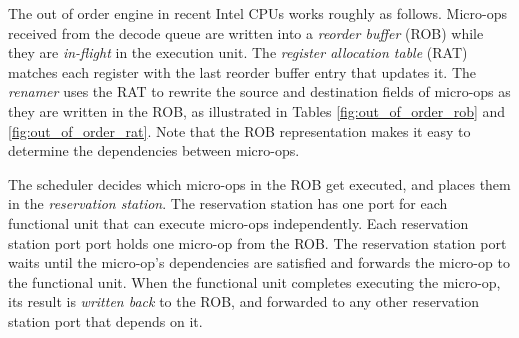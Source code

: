 
The out of order engine in recent Intel CPUs works roughly as follows.
Micro-ops received from the decode queue are written into a \textit{reorder
buffer} (ROB) while they are \textit{in-flight} in the execution unit. The
\textit{register allocation table} (RAT) matches each register with the last
reorder buffer entry that updates it. The \textit{renamer} uses the RAT to
rewrite the source and destination fields of micro-ops as they are written in
the ROB, as illustrated in Tables \ref{fig:out_of_order_rob} and
\ref{fig:out_of_order_rat}. Note that the ROB representation makes it easy to
determine the dependencies between micro-ops.

\begin{table}[hbt]
  \caption{
    Data written by the renamer into the reorder buffer (ROB), for the
    micro-ops in Table~\ref{fig:out_of_order_micro_ops}.
  }
  \label{fig:out_of_order_rob}
\end{table}

\begin{table}[hbt]
  \caption{
    Relevant entries of the register allocation table after the micro-ops in
    Table~\ref{fig:out_of_order_micro_ops} are inserted into the ROB.
  }
  \label{fig:out_of_order_rat}
\end{table}


The scheduler decides which micro-ops in the ROB get executed, and places them
in the \textit{reservation station}. The reservation station has one port
for each functional unit that can execute micro-ops independently. Each
reservation station port port holds one micro-op from the ROB. The reservation
station port waits until the micro-op's dependencies are satisfied and forwards
the micro-op to the functional unit. When the functional unit completes
executing the micro-op, its result is \textit{written back} to the ROB, and
forwarded to any other reservation station port that depends on it.

